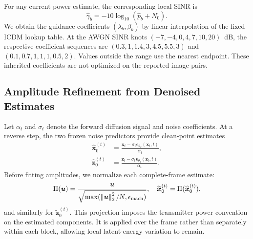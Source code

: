\documentclass[conference]{IEEEtran}
\newcommand{\vect}[1]{\boldsymbol{#1}}
\newcommand{\norm}[1]{\left\lVert#1\right\rVert}
\begin{document}
For any current power estimate, the corresponding local SINR is
\begin{equation}
    \widehat\gamma_b=-10\log_{10}(\widehat p_b+N_0).
    \label{eq:local_sinr}
\end{equation}
We obtain the guidance coefficients $(\lambda_b,\beta_b)$ by linear
interpolation of the fixed ICDM lookup table. At the AWGN SINR knots
$(-7,-4,0,4,7,10,20)$~dB, the respective coefficient sequences are
$(0.3,1,1.4,3,4.5,5.5,3)$ and $(0.1,0.7,1,1,1,0.5,2)$.
Values outside the range use the nearest endpoint. These inherited
coefficients are not optimized on the reported image pairs.

\subsection{Amplitude Refinement from Denoised Estimates}

Let $\alpha_t$ and $\sigma_t$ denote the forward diffusion signal and
noise coefficients. At a reverse step, the two frozen noise predictors
provide clean-point estimates
\begin{equation}
\begin{split}
 \widehat{\vect{x}}_0^{(t)}
 &=\frac{\vect{x}_t-\sigma_t
       \vect{\epsilon}_{\theta_x}(\vect{x}_t,t)}{\alpha_t},\\
 \widehat{\vect{z}}_0^{(t)}
 &=\frac{\vect{z}_t-\sigma_t
       \vect{\epsilon}_{\theta_z}(\vect{z}_t,t)}{\alpha_t}.
\end{split}
\label{eq:points}
\end{equation}
Before fitting amplitudes, we normalize each complete-frame estimate:
\begin{equation}
 \Pi(\vect{u})=
 \frac{\vect{u}}{\sqrt{\max(\norm{\vect{u}}_2^2/N,\epsilon_{\rm mach})}},
 \quad
 \widetilde{\vect{x}}_0^{(t)}=\Pi(\widehat{\vect{x}}_0^{(t)}),
 \label{eq:project}
\end{equation}
and similarly for $\widetilde{\vect{z}}_0^{(t)}$.
This projection imposes the transmitter power convention on the estimated
components. It is applied over the frame rather than separately within
each block, allowing local latent-energy variation to remain.
\end{document}
